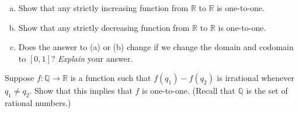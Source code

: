 \begin{exercise}{}
\begin{enumerate}[(a)]
\item
 Show that any strictly increasing function  from $\mathbb{R}$ to $\mathbb{R}$ is one-to-one.
\item
 Show that any strictly decreasing function  from $\mathbb{R}$ to $\mathbb{R}$ is one-to-one.
\item
Does the answer to (a) or (b) change if we change the domain and codomain to $[0,1]$?  \emph{Explain} your answer.
\end{enumerate}
\end{exercise}

\begin{exercise}{}
Suppose  $f:\mathbb{Q} \rightarrow \mathbb{R}$ is a function such that $f(q_1) - f(q_2)$ is irrational whenever $q_1 \neq q_2$.
Show that this implies that $f$ is one-to-one.  (Recall that $\mathbb{Q}$ is the set of rational numbers.)
\end{exercise}





 






